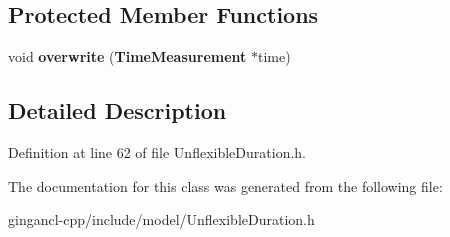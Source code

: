 \subsection*{Protected Member Functions}
\begin{CompactItemize}
\item 
void {\bf overwrite} ({\bf TimeMeasurement} $\ast$time)\label{classbr_1_1pucrio_1_1telemidia_1_1ginga_1_1ncl_1_1model_1_1time_1_1UnflexibleDuration_119061b371a12914c840e331d554e9b0}

\end{CompactItemize}


\subsection{Detailed Description}




Definition at line 62 of file UnflexibleDuration.h.

The documentation for this class was generated from the following file:\begin{CompactItemize}
\item 
gingancl-cpp/include/model/UnflexibleDuration.h\end{CompactItemize}
